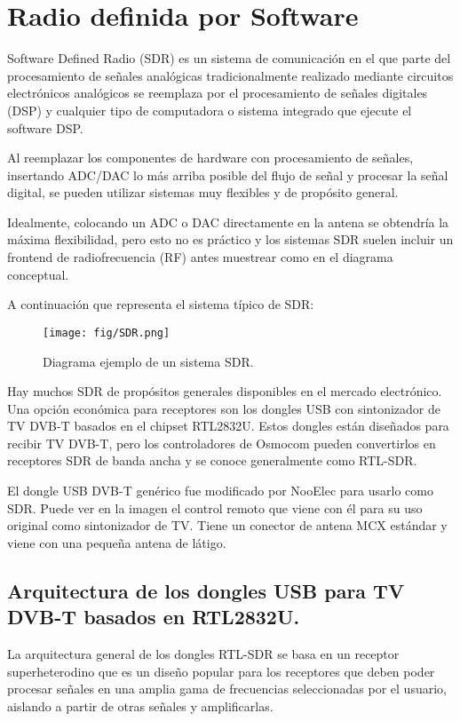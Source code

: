 \section{Radio definida por Software}

Software Defined Radio (SDR) es un sistema de comunicación en el que parte del procesamiento de señales analógicas tradicionalmente realizado mediante circuitos electrónicos analógicos se reemplaza por el procesamiento de señales digitales (DSP) y cualquier tipo de computadora o sistema integrado que ejecute el software DSP.

Al reemplazar los componentes de hardware con procesamiento de señales, insertando ADC/DAC lo más arriba posible del flujo de señal y procesar la señal digital, se pueden utilizar sistemas muy flexibles y de propósito general. 

Idealmente, colocando un ADC o DAC directamente en la antena se obtendría la máxima flexibilidad, pero esto no es práctico y los sistemas SDR suelen incluir un frontend de  radiofrecuencia (RF) antes muestrear como en el diagrama conceptual. 

A continuación que representa el sistema típico de SDR:

\begin{figure}[h!]
\centering
\texttt{[image: fig/SDR.png]}
\caption{Diagrama ejemplo de un sistema SDR.}
\label{fig:frontend}
\end{figure}

Hay muchos SDR de propósitos generales disponibles en el mercado electrónico. 
Una opción económica para receptores son los dongles USB con sintonizador de TV DVB-T basados en el chipset RTL2832U. Estos dongles están diseñados para recibir TV DVB-T, pero los controladores de Osmocom pueden convertirlos en receptores SDR de banda ancha y se conoce generalmente como RTL-SDR.

El dongle USB DVB-T genérico fue modificado por NooElec para usarlo como SDR. 
Puede ver en la imagen el control remoto que viene con él para su uso original como sintonizador de TV. Tiene un conector de antena MCX estándar y viene con una pequeña antena de látigo.

\subsection{Arquitectura de los dongles USB para TV DVB-T basados en RTL2832U.}

La arquitectura general de los dongles RTL-SDR se basa en un receptor superheterodino que es un diseño popular para los receptores que deben poder procesar señales en una amplia gama de frecuencias seleccionadas por el usuario, aislando a partir de otras señales y amplificarlas. 


